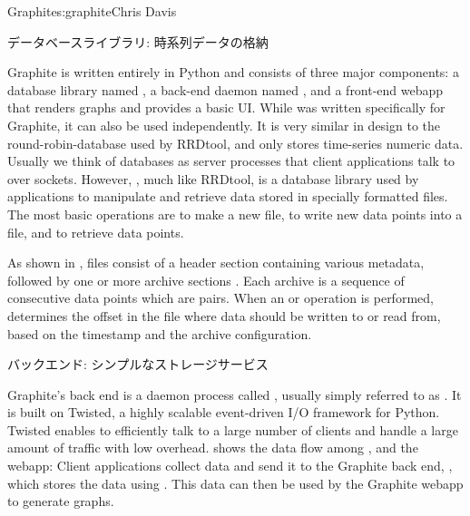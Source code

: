 \begin{aosachapter}{Graphite}{s:graphite}{Chris Davis}
\begin{aosasect1}{データベースライブラリ: 時系列データの格納}

Graphite is written entirely in Python and consists of three major
components: a database library named , a back-end daemon named
, and a front-end webapp that renders graphs and provides a
basic UI\@. While  was written specifically for Graphite, it can
also be used independently. It is very similar in design to the
round-robin-database used by RRDtool, and only stores time-series
numeric data.  Usually we think of databases as server processes that
client applications talk to over sockets. However, , much like
RRDtool, is a database library used by applications to manipulate and
retrieve data stored in specially formatted files. The most basic
 operations are  to make a new  file,
 to write new data points into a file, and 
to retrieve data points.


As shown in ,  files consist of a
header section containing various metadata, followed by one or more
archive sections . Each archive is a sequence of consecutive data
points which are  pairs. When an
 or  operation is performed, 
determines the offset in the file where data should be written to or
read from, based on the timestamp and the archive configuration.

\end{aosasect1}

\begin{aosasect1}{バックエンド: シンプルなストレージサービス}

Graphite's back end is a daemon process called , usually
simply referred to as .  It is built on Twisted, a highly
scalable event-driven I/O framework for Python. Twisted enables 
to efficiently talk to a large number of clients and handle a large
amount of traffic with low overhead.  
shows the data flow among ,  and the webapp: Client
applications collect data and send it to the Graphite back end, ,
which stores the data using . This data can then be used by the
Graphite webapp to generate graphs.


\end{aosasect1}
\end{aosachapter}
